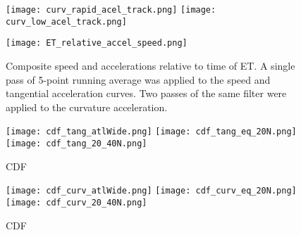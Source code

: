 \documentclass[wcd,manuscript]{copernicus}
\begin{document}

\clearpage

\begin{figure*}[t]
  \centering
    \texttt{[image: curv\_rapid\_acel\_track.png]}
     \texttt{[image: curv\_low\_acel\_track.png]}
  \caption{}
  \label{fig:curv_track}
\end{figure*}





\begin{figure*}[t]
  \texttt{[image: ET\_relative\_accel\_speed.png]}
  \caption{Composite speed and accelerations relative to time of ET. A single pass of 5-point running average was applied to the speed and tangential acceleration curves. Two passes of the same filter were applied to the curvature acceleration.}\label{fig:ET_SA}
\end{figure*}



\clearpage


\begin{figure*}[t]
  \texttt{[image: cdf\_tang\_atlWide.png]}
  \texttt{[image: cdf\_tang\_eq\_20N.png]}
  \texttt{[image: cdf\_tang\_20\_40N.png]}

  \caption{CDF}\label{fig:tang_cdf}
\end{figure*}



\begin{figure*}[t]
  \texttt{[image: cdf\_curv\_atlWide.png]}
  \texttt{[image: cdf\_curv\_eq\_20N.png]}
  \texttt{[image: cdf\_curv\_20\_40N.png]}
  
  \caption{CDF}\label{fig:curv_cdf}
\end{figure*}
\end{document}
